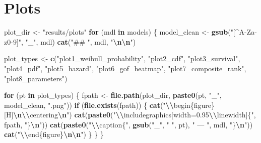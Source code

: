 \documentclass[
]{article}
\newenvironment{Shaded}{\begin{snugshade}}{\end{snugshade}}
\newcommand{\ControlFlowTok}[1]{\textcolor[rgb]{0.13,0.29,0.53}{\textbf{#1}}}
\newcommand{\FunctionTok}[1]{\textcolor[rgb]{0.13,0.29,0.53}{\textbf{#1}}}
\newcommand{\NormalTok}[1]{#1}
\newcommand{\OtherTok}[1]{\textcolor[rgb]{0.56,0.35,0.01}{#1}}
\newcommand{\SpecialCharTok}[1]{\textcolor[rgb]{0.81,0.36,0.00}{\textbf{#1}}}
\newcommand{\StringTok}[1]{\textcolor[rgb]{0.31,0.60,0.02}{#1}}
\begin{document}
\section{Plots}\label{plots}

\begin{Shaded}
\begin{Highlighting}[]
\NormalTok{plot\_dir }\OtherTok{\textless{}{-}} \StringTok{"results/plots"}
\ControlFlowTok{for}\NormalTok{ (mdl }\ControlFlowTok{in}\NormalTok{ models) \{}
\NormalTok{  model\_clean }\OtherTok{\textless{}{-}} \FunctionTok{gsub}\NormalTok{(}\StringTok{"[\^{}A{-}Za{-}z0{-}9]"}\NormalTok{, }\StringTok{"\_"}\NormalTok{, mdl)}
  \FunctionTok{cat}\NormalTok{(}\StringTok{"\#\# "}\NormalTok{, mdl, }\StringTok{"}\SpecialCharTok{\textbackslash{}n\textbackslash{}n}\StringTok{"}\NormalTok{)}
  
\NormalTok{  plot\_types }\OtherTok{\textless{}{-}} \FunctionTok{c}\NormalTok{(}\StringTok{"plot1\_weibull\_probability"}\NormalTok{, }\StringTok{"plot2\_cdf"}\NormalTok{, }\StringTok{"plot3\_survival"}\NormalTok{,}
                  \StringTok{"plot4\_pdf"}\NormalTok{, }\StringTok{"plot5\_hazard"}\NormalTok{, }\StringTok{"plot6\_gof\_heatmap"}\NormalTok{,}
                  \StringTok{"plot7\_composite\_rank"}\NormalTok{, }\StringTok{"plot8\_parameters"}\NormalTok{)}
  
  \ControlFlowTok{for}\NormalTok{ (pt }\ControlFlowTok{in}\NormalTok{ plot\_types) \{}
\NormalTok{    fpath }\OtherTok{\textless{}{-}} \FunctionTok{file.path}\NormalTok{(plot\_dir, }\FunctionTok{paste0}\NormalTok{(pt, }\StringTok{"\_"}\NormalTok{, model\_clean, }\StringTok{".png"}\NormalTok{))}
    \ControlFlowTok{if}\NormalTok{ (}\FunctionTok{file.exists}\NormalTok{(fpath)) \{}
      \FunctionTok{cat}\NormalTok{(}\StringTok{"}\SpecialCharTok{\textbackslash{}\textbackslash{}}\StringTok{begin\{figure\}[H]}\SpecialCharTok{\textbackslash{}n\textbackslash{}\textbackslash{}}\StringTok{centering}\SpecialCharTok{\textbackslash{}n}\StringTok{"}\NormalTok{)}
      \FunctionTok{cat}\NormalTok{(}\FunctionTok{paste0}\NormalTok{(}\StringTok{"}\SpecialCharTok{\textbackslash{}\textbackslash{}}\StringTok{includegraphics[width=0.95}\SpecialCharTok{\textbackslash{}\textbackslash{}}\StringTok{linewidth]\{"}\NormalTok{, fpath, }\StringTok{"\}}\SpecialCharTok{\textbackslash{}n}\StringTok{"}\NormalTok{))}
      \FunctionTok{cat}\NormalTok{(}\FunctionTok{paste0}\NormalTok{(}\StringTok{"}\SpecialCharTok{\textbackslash{}\textbackslash{}}\StringTok{caption\{"}\NormalTok{, }\FunctionTok{gsub}\NormalTok{(}\StringTok{"\_"}\NormalTok{, }\StringTok{" "}\NormalTok{, pt), }\StringTok{" — "}\NormalTok{, mdl, }\StringTok{"\}}\SpecialCharTok{\textbackslash{}n}\StringTok{"}\NormalTok{))}
      \FunctionTok{cat}\NormalTok{(}\StringTok{"}\SpecialCharTok{\textbackslash{}\textbackslash{}}\StringTok{end\{figure\}}\SpecialCharTok{\textbackslash{}n\textbackslash{}n}\StringTok{"}\NormalTok{)}
\NormalTok{    \}}
\NormalTok{  \}}
\NormalTok{\}}
\end{Highlighting}
\end{Shaded}
\end{document}
